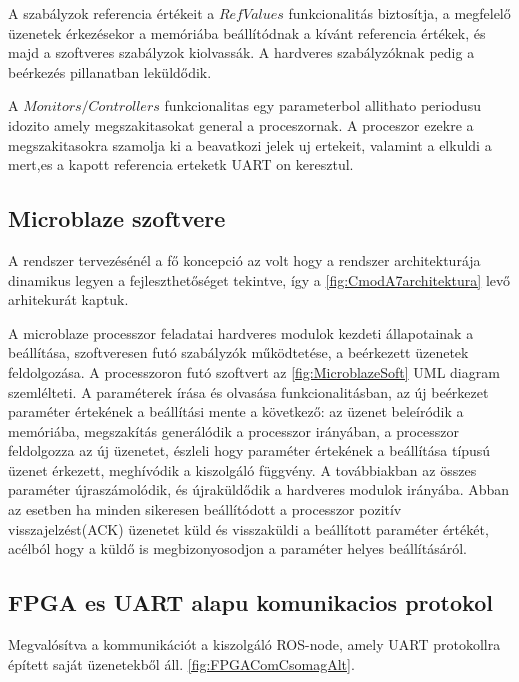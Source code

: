 A szabályzok referencia értékeit a $RefValues$ funkcionalitás biztosítja, a megfelelő üzenetek érkezésekor a memóriába beállítódnak a kívánt referencia értékek, és majd a szoftveres szabályzok kiolvassák. A hardveres szabályzóknak pedig a beérkezés pillanatban leküldődik.

A $Monitors/Controllers$ funkcionalitas egy parameterbol allithato periodusu idozito amely megszakitasokat general a proceszornak. A proceszor ezekre a megszakitasokra szamolja ki a beavatkozi jelek uj ertekeit, valamint a elkuldi a mert,es a kapott referencia erteketk UART on keresztul.



\subsection{Microblaze szoftvere}

A rendszer tervezésénél a fő koncepció az volt hogy a rendszer architekturája dinamikus legyen a fejleszthetőséget tekintve, így a \ref{fig:CmodA7architektura} levő arhitekurát kaptuk.

A microblaze processzor feladatai hardveres modulok kezdeti állapotainak a beállítása, szoftveresen futó szabályzók működtetése, a beérkezett üzenetek feldolgozása. A processzoron futó szoftvert az \ref{fig:MicroblazeSoft} UML diagram szemlélteti.
A paraméterek írása és olvasása funkcionalitásban, az új beérkezet paraméter értekének a beállítási mente a következő: az üzenet beleíródik a memóriába, megszakítás generálódik a processzor irányában, a processzor feldolgozza az új üzenetet, észleli hogy paraméter értekének a beállítása típusú üzenet érkezett, meghívódik a kiszolgáló függvény. A továbbiakban az összes paraméter újraszámolódik, és újraküldődik a hardveres modulok irányába. Abban az esetben ha minden sikeresen beállítódott a processzor pozitív visszajelzést(ACK) üzenetet küld és visszaküldi a beállított paraméter értékét, acélból hogy a küldő is megbizonyosodjon a paraméter helyes beállításáról.


\renewcommand{\img}{SajatRobot/FPGAmodulok/uBlazeAndFpgaUML.jpg}
\renewcommand{\sources}{*}
\renewcommand{\captionn}{MicroBlaze processzoron futó szoftver diagramja}
\renewcommand{\figlabel}{MicroblazeSoft}





\subsection{FPGA es UART alapu komunikacios protokol}
\label{FPGAcomuSection}
Megvalósítva a kommunikációt a kiszolgáló ROS-node, amely UART protokollra épített saját üzenetekből áll. \ref{fig:FPGAComCsomagAlt}.

